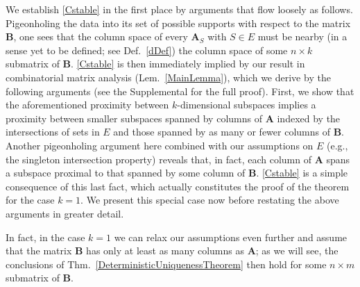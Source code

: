 \documentclass[9pt,twocolumn]{pnas-new}
\begin{document}
We establish \eqref{Cstable} in the first place by arguments that flow loosely as follows. Pigeonholing the data into its set of possible supports with respect to the matrix $\mathbf{B}$, one sees that the column space of every $\mathbf{A}_S$ with $S \in E$ must be nearby (in a sense yet to be defined; see Def.~\ref{dDef}) the column space of some $n \times k$ submatrix of $\mathbf{B}$. \eqref{Cstable} is then immediately implied by our result in combinatorial matrix analysis (Lem.~\ref{MainLemma}), which we derive by the following arguments (see the Supplemental for the full proof). First, we show that the aforementioned proximity between $k$-dimensional subspaces implies a proximity between smaller subspaces spanned by columns of $\mathbf{A}$ indexed by the intersections of sets in $E$ and those spanned by as many or fewer columns of $\mathbf{B}$. Another pigeonholing argument here combined with our assumptions on $E$ (e.g., the singleton intersection property) reveals that, in fact, each column of $\mathbf{A}$ spans a subspace proximal to that spanned by some column of $\mathbf{B}$. \eqref{Cstable} is a simple consequence of this last fact, which actually constitutes the proof of the theorem for the case $k=1$. We present this special case now before restating the above arguments in greater detail.

In fact, in the case $k=1$ we can relax our assumptions even further and assume that the matrix $\mathbf{B}$ has only at least as many columns as $\mathbf{A}$; as we will see, the conclusions of Thm.~\ref{DeterministicUniquenessTheorem} then hold for some $n \times m$ submatrix of $\mathbf{B}$.
\end{document}
